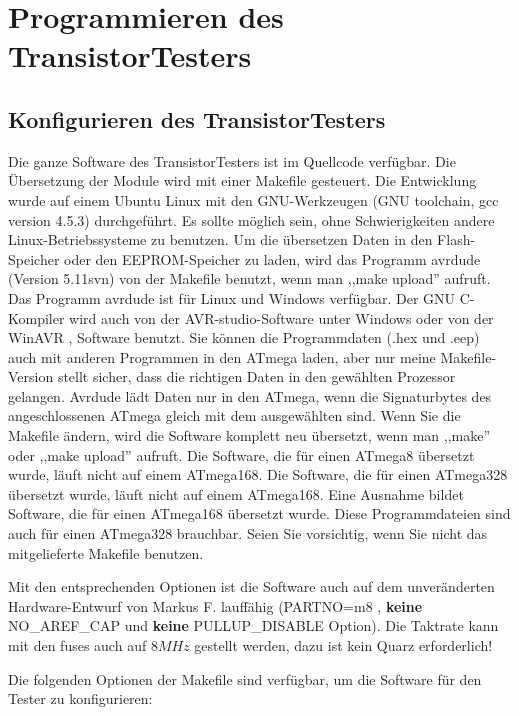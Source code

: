 \chapter{Programmieren des TransistorTesters}

\section{Konfigurieren des TransistorTesters}
\label{sec:config}
Die ganze Software des TransistorTesters ist im Quellcode verfügbar.
Die Übersetzung der Module wird mit einer Makefile gesteuert. Die Entwicklung wurde
auf einem Ubuntu Linux mit den GNU-Werkzeugen (GNU toolchain, gcc version 4.5.3) durchgeführt.
Es sollte möglich sein, ohne Schwierigkeiten andere Linux-Betriebssysteme zu benutzen.
Um die übersetzen Daten in den Flash-Speicher oder den EEPROM-Speicher zu laden, wird das
Programm avrdude \cite{avrdude} (Version 5.11svn) von der Makefile benutzt, wenn man ,,make upload'' aufruft.
Das Programm avrdude ist für Linux und Windows verfügbar.
Der GNU C-Kompiler wird auch von der AVR-studio-Software unter Windows oder von
der WinAVR \cite{winavr1},\cite{winavr2} Software benutzt.
Sie können die Programmdaten (.hex und .eep) auch mit anderen Programmen in den ATmega laden,
aber nur meine Makefile-Version stellt sicher, dass die richtigen Daten in den gewählten Prozessor gelangen.
Avrdude lädt Daten nur in den ATmega, wenn die Signaturbytes des angeschlossenen ATmega gleich mit dem ausgewählten sind.
Wenn Sie die Makefile ändern, wird die Software komplett neu übersetzt, wenn man ,,make'' oder
,,make upload'' aufruft.
Die Software, die für einen ATmega8 übersetzt wurde, läuft nicht auf einem ATmega168.
Die Software, die für einen ATmega328 übersetzt wurde, läuft nicht auf einem ATmega168.
Eine Ausnahme bildet Software, die für einen ATmega168 übersetzt wurde. Diese Programmdateien
sind auch für einen ATmega328 brauchbar.
Seien Sie vorsichtig, wenn Sie nicht das mitgelieferte Makefile benutzen.

Mit den entsprechenden Optionen ist die Software auch auf dem unveränderten Hardware-Entwurf von
Markus F. lauffähig (PARTNO=m8 , \textbf{keine} NO\_AREF\_CAP und \textbf{keine} PULLUP\_DISABLE Option).
Die Taktrate kann mit den fuses auch auf \(8MHz\) gestellt werden, dazu ist kein Quarz erforderlich!


Die folgenden Optionen der Makefile sind verfügbar, um die Software für den Tester zu konfigurieren:

